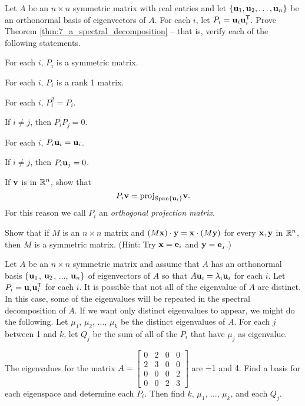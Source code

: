 \item \label{ex:7_a_spectral_decomposition} Let $A$ be an $n \times n$ symmetric matrix with real entries and let $\{\mathbf{u}_1, \mathbf{u}_2, \ldots, \mathbf{u}_n\}$ be an orthonormal basis of eigenvectors of $A$. For each $i$, let $P_i = \mathbf{u}_i\mathbf{u}_i^{\mathsf{T}}$. Prove Theorem \ref{thm:7_a_spectral_decomposition} -- that is, verify each of the following statements.
	\ba
	\item For each $i$, $P_i$ is a symmetric matrix. 

	\item For each $i$, $P_i$ is a rank 1 matrix.

	\item For each $i$, $P_i^2 = P_i$.

	\item If $i \neq j$, then $P_iP_j = 0$. 

	\item For each $i$, $P_i \mathbf{u}_i = \mathbf{u}_i$.

	\item If $i \neq j$, then $P_i \mathbf{u}_j = 0$. 

	\item If $\mathbf{v}$ is in $\mathbb{R}^n$, show that 
\[P_i \mathbf{v} = \text{proj}_{\text{Span}\{\mathbf{u}_i\} } \mathbf{v}.\]
For this reason we call $P_i$ an \emph{orthogonal projection matrix}. 
	
		\ea

\item Show that if $M$ is an $n \times n$ matrix and $(M\mathbf{x}) \cdot \mathbf{y} = \mathbf{x} \cdot (M\mathbf{y})$ for every $\mathbf{x}, \mathbf{y}$ in $\mathbb{R}^n$, then $M$ is a symmetric matrix. (Hint: Try $\mathbf{x} = {\bf e}_i$ and $\mathbf{y} = {\bf e}_j$.)
	
	
\item Let $A$ be an $n \times n$ symmetric matrix and assume that $A$ has an orthonormal basis $\{\mathbf{u}_1$, $\mathbf{u}_2$, $\ldots$, $\mathbf{u}_n\}$ of eigenvectors of $A$ so that $A \mathbf{u}_i = \lambda_i \mathbf{u}_i$ for each $i$. Let $P_i = \mathbf{u}_i\mathbf{u}_i^{\mathsf{T}}$ for each $i$. It is possible that not all of the eigenvalue of $A$ are distinct. In this case, some of the eigenvalues will be repeated in the spectral decomposition of $A$. If we want only distinct eigenvalues to appear, we might do the following. Let $\mu_1$, $\mu_2$, $\ldots$, $\mu_k$ be the distinct eigenvalues of $A$. For each $j$ between 1 and $k$, let $Q_j$ be the sum of all of the $P_i$ that have $\mu_j$ as eigenvalue. 
	\ba
	\item The eigenvalues for the matrix $A = \left[ \begin{array}{cccc} 0&2&0&0 \\ 2&3&0&0 \\ 0&0&0&2 \\ 0&0&2&3 \end{array} \right]$ are $-1$ and $4$. Find a basis for each eigenspace and determine each $P_i$. Then find $k$, $\mu_1$, $\ldots$, $\mu_k$, and each $Q_j$.

